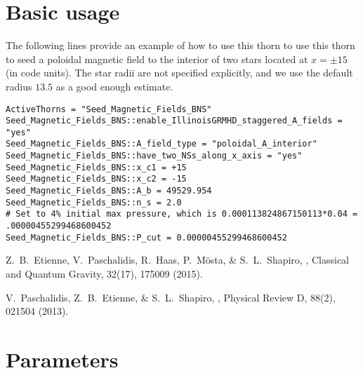 \section{Basic usage}
\label{sec:basic_usage}

The following lines provide an example of how to use this thorn to use
this thorn to seed a poloidal magnetic field to the interior of two
stars located at $x=\pm15$ (in code units). The star radii are not
specified explicitly, and we use the default radius $13.5$ as a good
enough estimate.

\begin{verbatim}
ActiveThorns = "Seed_Magnetic_Fields_BNS"
Seed_Magnetic_Fields_BNS::enable_IllinoisGRMHD_staggered_A_fields = "yes"
Seed_Magnetic_Fields_BNS::A_field_type = "poloidal_A_interior"
Seed_Magnetic_Fields_BNS::have_two_NSs_along_x_axis = "yes"
Seed_Magnetic_Fields_BNS::x_c1 = +15
Seed_Magnetic_Fields_BNS::x_c2 = -15
Seed_Magnetic_Fields_BNS::A_b = 49529.954
Seed_Magnetic_Fields_BNS::n_s = 2.0
# Set to 4% initial max pressure, which is 0.000113824867150113*0.04 = .00000455299468600452
Seed_Magnetic_Fields_BNS::P_cut = 0.00000455299468600452
\end{verbatim}


\begin{thebibliography}{2}

  Z.~B.~Etienne, V.~Paschalidis, R.~Haas, P.~Mösta, \& S.~L.~Shapiro,
  ,
  Classical and Quantum Gravity, 32(17), 175009 (2015).

  V.~Paschalidis, Z.~B.~Etienne, \& S.~L.~Shapiro,
  ,
  Physical Review D, 88(2), 021504 (2013).

\end{thebibliography}




\section{Parameters} 


